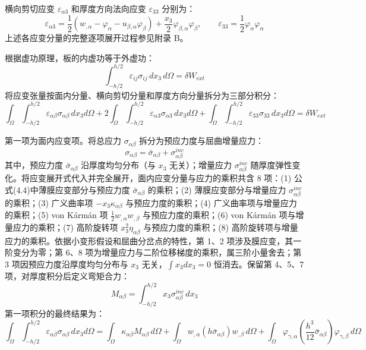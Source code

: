 横向剪切应变 $\varepsilon_{\alpha 3}$ 和厚度方向法向应变 $\varepsilon_{33}$ 分别为：
\begin{equation}
\varepsilon_{\alpha 3} = \frac{1}{2}(w_{,\alpha} - \varphi_\alpha - u_{\beta,\alpha}\varphi_\beta) + \frac{x_3}{2}\varphi_{\beta,\alpha}\varphi_\beta, \qquad \varepsilon_{33} = \frac{1}{2}\varphi_\alpha\varphi_\alpha
\end{equation}
上述各应变分量的完整逐项展开过程参见附录 B。

根据虚功原理，板的内虚功等于外虚功：
\begin{equation}
\int_{-h/2}^{h/2} \varepsilon_{ij}\sigma_{ij}\, dx_3\, d\Omega = \delta W_{ext}
\end{equation}
将应变张量按面内分量、横向剪切分量和厚度方向分量拆分为三部分积分：
\begin{equation}
\int_\Omega\int_{-h/2}^{h/2} \varepsilon_{\alpha\beta}\sigma_{\alpha\beta}\, dx_3 d\Omega + 2\int_\Omega\int_{-h/2}^{h/2} \varepsilon_{\alpha 3}\sigma_{\alpha 3}\, dx_3 d\Omega + \int_\Omega\int_{-h/2}^{h/2} \varepsilon_{33}\sigma_{33}\, dx_3 d\Omega = \delta W_{ext}
\end{equation}

第一项为面内应变项。将总应力 $\sigma_{\alpha\beta}$ 拆分为预应力度与屈曲增量应力：
\begin{equation}
\sigma_{\alpha\beta} = \bar{\sigma}_{\alpha\beta} + \sigma_{\alpha\beta}^{inc}
\end{equation}
其中，预应力度 $\bar{\sigma}_{\alpha\beta}$ 沿厚度均匀分布（与 $x_3$ 无关）；增量应力 $\sigma_{\alpha\beta}^{inc}$ 随厚度弹性变化。将应变展开式代入并完全展开，面内应变分量与应力的乘积共含 8 项：(1) 公式(4.4)中薄膜应变部分与预应力度 $\bar{\sigma}_{\alpha\beta}$ 的乘积；(2) 薄膜应变部分与增量应力 $\sigma_{\alpha\beta}^{inc}$ 的乘积；(3) 广义曲率项 $-x_3\kappa_{\alpha\beta}$ 与预应力度的乘积；(4) 广义曲率项与增量应力的乘积；(5) von K\'arm\'an 项 $\frac{1}{2}w_{,\alpha}w_{,\beta}$ 与预应力度的乘积；(6) von K\'arm\'an 项与增量应力的乘积；(7) 高阶旋转项 $x_3^2\eta_{\alpha\beta}$ 与预应力度的乘积；(8) 高阶旋转项与增量应力的乘积。依据小变形假设和屈曲分岔点的特性，第 1、2 项涉及膜应变，其一阶变分为零；第 6、8 项为增量应力与二阶位移梯度的乘积，属三阶小量舍去；第 3 项因预应力度沿厚度均匀分布与 $x_3$ 无关，$\int x_3 dx_3 = 0$ 恒消去。保留第 4、5、7 项，对厚度积分后定义弯矩合力：
\begin{equation}
M_{\alpha\beta} = \int_{-h/2}^{h/2} x_3 \sigma_{\alpha\beta}^{inc}\, dx_3
\end{equation}
第一项积分的最终结果为：
\begin{equation}
\int_\Omega\int_{-h/2}^{h/2} \varepsilon_{\alpha\beta}\sigma_{\alpha\beta}\, dx_3 d\Omega = \int_\Omega \kappa_{\alpha\beta}M_{\alpha\beta}\, d\Omega + \int_\Omega w_{,\alpha}(h\bar{\sigma}_{\alpha\beta})w_{,\beta}\, d\Omega + \int_\Omega \varphi_{\gamma,\alpha}\left(\frac{h^3}{12}\bar{\sigma}_{\alpha\beta}\right)\varphi_{\gamma,\beta}\, d\Omega
\end{equation}

